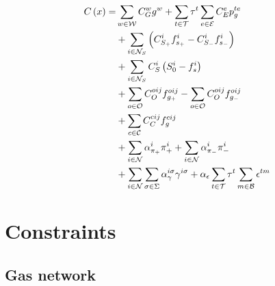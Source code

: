 
\begin{equation}
\begin{aligned}
C \left( x \right) = & \sum_{w \in \cal{W}}{C^{w}_{G} g^{w}} + \sum_{t \in \cal{T}} {\tau}^{t}  \sum_{e \in \cal{E}} {C^{e}_{E} p_{g}^{te}}\\ 
				& + \sum_{i \in {\cal{N}}_{S}}{\left({C^{i}_{S_+} f^{i}_{s_+}} - {C^{i}_{S_-} f^{i}_{s_-}}  \right)}\\
				& + \sum_{i \in {\cal{N}}_{S}}{C^{i}_{S} \left( S^{i}_{0} - f^{i}_{s} \right)} \\
				& + \sum_{o \in \cal{O}}{C^{oij}_{O} f^{oij}_{g_+}} - \sum_{o \in \cal{O}}{C^{oij}_{O} f^{oij}_{g_-}} \\
				& + \sum_{c \in \cal{C}}{C^{cij}_{C} f^{cij}_{g}} \\ 
				& + \sum_{i \in \cal{N}}{\alpha^{i}_{\pi_+} \pi^{i}_{+}} + \sum_{i \in \cal{N}}{ \alpha^{i}_{\pi_-} \pi^{i}_{-}} \\
				& + \sum_{i \in \cal{N}}\sum_{\sigma \in \Sigma} {\alpha_{\gamma}^{i \sigma}\gamma^{i \sigma}} + \alpha_{\epsilon} \sum_{t \in \cal{T}} {\tau}^{t} \sum_{m \in \cal{B}} {\epsilon^{tm}}  
\end{aligned}
\label{obj_func}
\end{equation}

\section{Constraints}

\subsection{Gas network}

